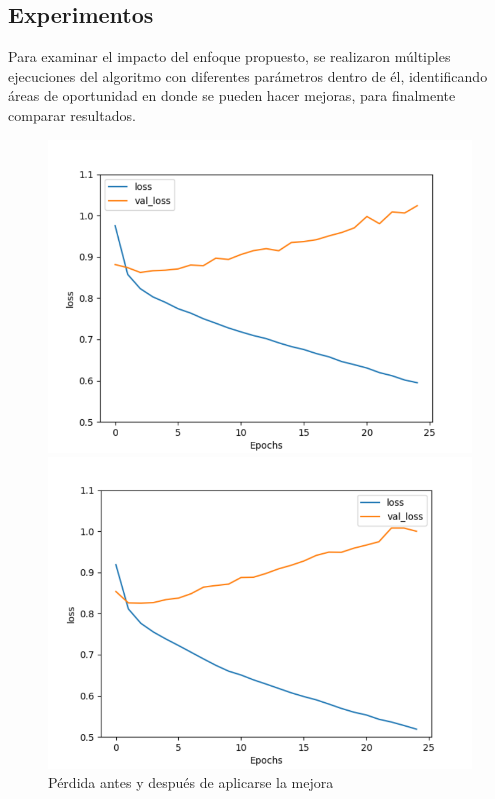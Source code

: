 \documentclass[a4]{sciposter}
\begin{document}
\begin{multicols}{3}
\section{Experimentos}
Para examinar el impacto del enfoque propuesto, se realizaron múltiples ejecuciones del algoritmo con diferentes parámetros dentro de él, identificando áreas de oportunidad en donde se pueden hacer mejoras, para finalmente comparar resultados.



\begin{figure}[!tbp]
\captionsetup{type=figure}


  \centering
  \begin{minipage}[b]{0.45\textwidth}
    \includegraphics[width=1.1\textwidth]{img/Loss Before.png}
  \end{minipage}
  \begin{minipage}[b]{0.45\textwidth}
    \includegraphics[width=1.1\textwidth]{img/Loss After.png}
  \end{minipage}
  \caption{Pérdida antes y después de aplicarse la mejora}
\end{figure}




\end{multicols}
\end{document}
